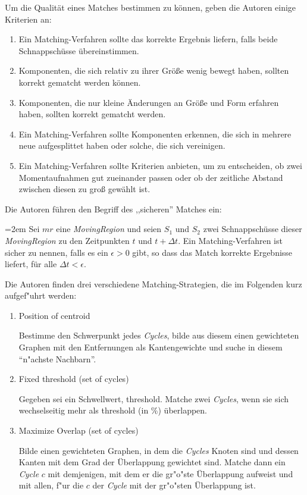 Um die Qualität eines Matches bestimmen zu können, geben die Autoren einige Kriterien an:

\begin{enumerate}
\item Ein Matching-Verfahren sollte das korrekte Ergebnis liefern, falls beide Schnappschüsse übereinstimmen.
\item Komponenten, die sich relativ zu ihrer Größe wenig bewegt haben, sollten korrekt gematcht werden können.
\item Komponenten, die nur kleine Änderungen an Größe und Form erfahren haben, sollten korrekt gematcht werden.
\item Ein Matching-Verfahren sollte Komponenten erkennen, die sich in mehrere neue aufgesplittet haben oder solche, die sich vereinigen.
\item Ein Matching-Verfahren sollte Kriterien anbieten, um zu entscheiden, ob zwei Momentaufnahmen gut zueinander passen oder ob der zeitliche Abstand zwischen diesen zu groß gewählt ist.
\end{enumerate}

Die Autoren führen den Begriff des ,,sicheren'' Matches ein:

\par
\begingroup
\leftskip=2em 
Sei $mr$ eine \textit{MovingRegion} und seien $S_1$ und $S_2$ zwei Schnappschüsse dieser \textit{MovingRegion} zu den Zeitpunkten $t$ und $t+\Delta t$. Ein Matching-Verfahren ist sicher zu nennen, falls es ein $\epsilon >0$ gibt, so dass das Match korrekte Ergebnisse liefert, für alle $\Delta t < \epsilon$.
\par
\endgroup

Die Autoren finden drei verschiedene Matching-Strategien, die im Folgenden kurz aufgef"uhrt werden:
\begin{enumerate}
\item Position of centroid \label{MatchSchwer}

Bestimme den Schwerpunkt jedes \textit{Cycles},  bilde aus diesem einen gewichteten Graphen mit den Entfernungen als Kantengewichte und suche in diesem "`n"achste Nachbarn"'.
\item Fixed threshold (set of cycles)\label{fixedThre}

Gegeben sei ein Schwellwert, threshold. Matche zwei \textit{Cycles}, wenn sie sich wechselseitig  mehr als threshold (in \%) überlappen.

\item Maximize Overlap (set of cycles)

Bilde einen gewichteten Graphen, in dem die \textit{Cycles} Knoten sind und dessen Kanten mit dem Grad der Überlappung gewichtet sind. Matche dann ein \textit{Cycle} $c$ mit demjenigen, mit dem er die gr"o"ste Überlappung aufweist und mit allen, f"ur die $c$ der \textit{Cycle} mit der gr"o"sten Überlappung ist.
\end{enumerate} 

